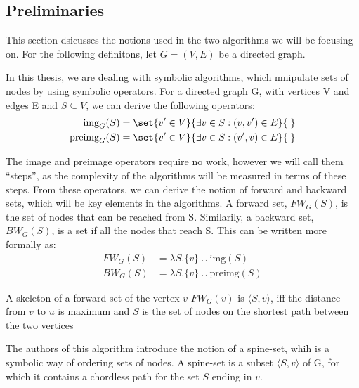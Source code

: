 \documentclass[../master.tex]{subfiles}
\newcommand{\FW}[2][G]{\ensuremath{FW_{#1}(#2)}}
\newcommand{\BW}[2][G]{\ensuremath{BW_{#1}(#2)}}
\newcommand{\pair}[2]{\ensuremath{\langle #1, #2\rangle}}
\newcommand{\img}[2][G]{\ensuremath{\text{img}_{#1}(#2)}}
\newcommand{\pre}[2][G]{\ensuremath{\text{preimg}_{#1}(#2)}}
\begin{document}
\subsection{Preliminaries}

This section dsicusses the notions used in the two algorithms we will be focusing on. For the following definitons, let $G=(V,E)$ be a directed graph.

In this thesis, we are dealing with symbolic algorithms, which mnipulate sets of nodes by using symbolic operators. For a directed graph G, with vertices V and edges E and $S\subseteq V$, we can derive the following operators:
\begin{align*}
\img S &= \set{v' \in V}{\exists v\in S:(v, v')\in E}{|}\\
\pre S &= \set{v' \in V}{\exists v\in S:(v', v)\in E}{|}
\end{align*}

The image and preimage operators require no work, however we will call them ``steps'', as the complexity of the algorithms will be measured in terms of these steps.
From these operators, we can derive the notion of forward and backward sets, which will be key elements in the algorithms. A forward set, \FW{S}, is the set of nodes that can be reached from S. Similarily, a backward set, \BW{S}, is a set if all the nodes that reach S. This can be written more formally as:
\begin{align*}
\FW{S} &= \lambda S.\{v\}\cup \text{img}(S)\\
\BW{S} &= \lambda S.\{v\}\cup \text{preimg}(S)
\end{align*}

A skeleton of a forward set of the vertex $v$ \FW{v} is \pair{S}{v}, iff the distance from $v$ to $u$ is maximum and $S$ is the set of nodes on the shortest path between the two vertices

The authors of this algorithm introduce the notion of a spine-set, whih is a symbolic way of ordering sets of nodes. A spine-set is a subset \pair{S}{v} of G, for which it contains a chordless path for the set $S$ ending in $v$.
\end{document}
